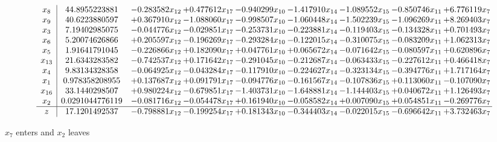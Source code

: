 \documentclass[10pt]{article}
\begin{document}
 \[\begin{array}{c| c c@{\hskip 2pt} c@{\hskip 2pt} c@{\hskip 2pt} c@{\hskip 2pt} c@{\hskip 2pt} c@{\hskip 2pt} c@{\hskip 2pt} }
 x_{8}   &  44.8955223881 & -0.283582 x_{12} & + 0.477612 x_{17} & -0.940299 x_{10} & -1.417910 x_{14} & -1.089552 x_{15} & -0.850746 x_{11} & + 6.776119 x_{7}\\
 x_{9}   &  40.6223880597 & + 0.367910 x_{12} & -1.088060 x_{17} & -0.998507 x_{10} & -1.060448 x_{14} & -1.502239 x_{15} & -1.096269 x_{11} & + 8.269403 x_{7}\\
 x_{3}   &  7.19402985075 & -0.044776 x_{12} & -0.029851 x_{17} & -0.253731 x_{10} & -0.223881 x_{14} & -0.119403 x_{15} & -0.134328 x_{11} & + 0.701493 x_{7}\\
 x_{6}   &  5.20074626866 & + 0.205597 x_{12} & -0.196269 x_{17} & -0.293284 x_{10} & -0.122015 x_{14} & -0.310075 x_{15} & -0.083209 x_{11} & + 1.062313 x_{7}\\
 x_{5}   &  1.91641791045 & -0.226866 x_{12} & + 0.182090 x_{17} & + 0.047761 x_{10} & + 0.065672 x_{14} & -0.071642 x_{15} & -0.080597 x_{11} & + 0.620896 x_{7}\\
 x_{13}   &  21.6343283582 & -0.742537 x_{12} & + 0.171642 x_{17} & -0.291045 x_{10} & -0.212687 x_{14} & -0.063433 x_{15} & -0.227612 x_{11} & + 0.466418 x_{7}\\
 x_{4}   &  9.83134328358 & -0.064925 x_{12} & -0.043284 x_{17} & -0.117910 x_{10} & -0.224627 x_{14} & -0.323134 x_{15} & -0.394776 x_{11} & + 1.717164 x_{7}\\
 x_{1}   &  0.978358208955 & + 0.137687 x_{12} & + 0.091791 x_{17} & -0.094776 x_{10} & -0.161567 x_{14} & -0.107836 x_{15} & + 0.113060 x_{11} & -0.107090 x_{7}\\
 x_{16}   &  33.1440298507 & + 0.980224 x_{12} & -0.679851 x_{17} & -1.403731 x_{10} & -1.648881 x_{14} & -1.144403 x_{15} & + 0.040672 x_{11} & + 1.126493 x_{7}\\
 x_{2}   &  0.0291044776119 & -0.081716 x_{12} & -0.054478 x_{17} & + 0.161940 x_{10} & -0.058582 x_{14} & + 0.007090 x_{15} & + 0.054851 x_{11} & -0.269776 x_{7}\\
\hline
z    &  17.1201492537 & -0.798881 x_{12} & -0.199254 x_{17} & + 0.181343 x_{10} & -0.344403 x_{14} & -0.022015 x_{15} & -0.696642 x_{11} & + 3.732463 x_{7}\\
\end{array}\]


 $ x_{7} $ enters and $ x_{2} $ leaves 
\end{document}
